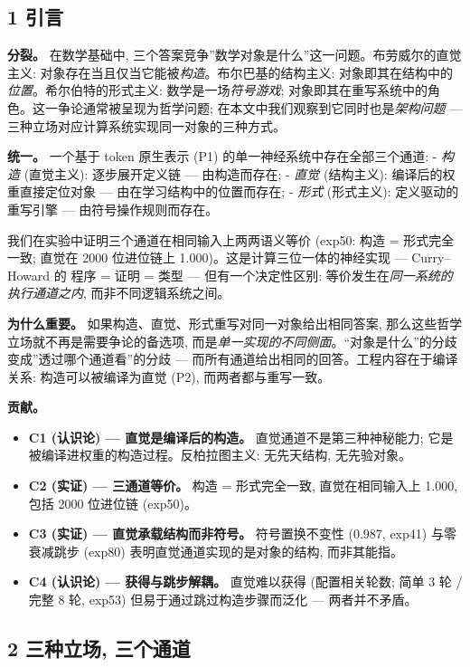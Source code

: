 \documentclass[
]{article}
\providecommand{\tightlist}{%
  \setlength{\itemsep}{0pt}\setlength{\parskip}{0pt}}
\begin{document}
\subsection{1 引言}\label{ux5f15ux8a00}

\textbf{分裂。} 在数学基础中,
三个答案竞争''数学对象是什么''这一问题。布劳威尔的直觉主义:
对象存在当且仅当它能被\emph{构造}。布尔巴基的结构主义:
对象即其在结构中的\emph{位置}。希尔伯特的形式主义:
数学是一场\emph{符号游戏};
对象即其在重写系统中的角色。这一争论通常被呈现为哲学问题;
在本文中我们观察到它同时也是\emph{架构问题} ---
三种立场对应计算系统实现同一对象的三种方式。

\textbf{统一。} 一个基于 token 原生表示 (P1)
的单一神经系统中存在全部三个通道: - \emph{构造} (直觉主义):
逐步展开定义链 --- 由构造而存在; - \emph{直觉} (结构主义):
编译后的权重直接定位对象 --- 由在学习结构中的位置而存在; - \emph{形式}
(形式主义): 定义驱动的重写引擎 --- 由符号操作规则而存在。

我们在实验中证明三个通道在相同输入上两两语义等价 (exp50: 构造 =
形式完全一致; 直觉在 2000 位进位链上 1.000)。这是计算三位一体的神经实现
--- Curry--Howard 的 程序 = 证明 = 类型 --- 但有一个决定性区别:
等价发生在\emph{同一系统的执行通道之内}, 而非不同逻辑系统之间。

\textbf{为什么重要。} 如果构造、直觉、形式重写对同一对象给出相同答案,
那么这些哲学立场就不再是需要争论的备选项,
而是\emph{单一实现的不同侧面}。``对象是什么''的分歧变成''透过哪个通道看''的分歧
--- 而所有通道给出相同的回答。工程内容在于编译关系: 构造可以被编译为直觉
(P2), 而两者都与重写一致。

\textbf{贡献。}

\begin{itemize}
\tightlist
\item
  \textbf{C1 (认识论) --- 直觉是编译后的构造。}
  直觉通道不是第三种神秘能力; 它是被编译进权重的构造过程。反柏拉图主义:
  无先天结构, 无先验对象。
\item
  \textbf{C2 (实证) --- 三通道等价。} 构造 = 形式完全一致,
  直觉在相同输入上 1.000, 包括 2000 位进位链 (exp50)。
\item
  \textbf{C3 (实证) --- 直觉承载结构而非符号。} 符号置换不变性 (0.987,
  exp41) 与零衰减跳步 (exp80) 表明直觉通道实现的是对象的结构,
  而非其能指。
\item
  \textbf{C4 (认识论) --- 获得与跳步解耦。} 直觉难以获得 (配置相关轮数;
  简单 3 轮 / 完整 8 轮, exp53) 但易于通过跳过构造步骤而泛化 ---
  两者并不矛盾。
\end{itemize}

\subsection{2 三种立场,
三个通道}\label{ux4e09ux79cdux7acbux573a-ux4e09ux4e2aux901aux9053}
\end{document}

